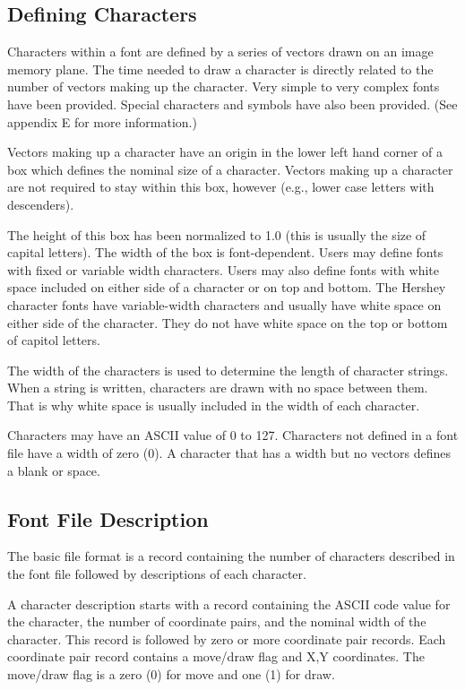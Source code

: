 \subsection{Defining Characters}
Characters within a font are defined by a series of vectors
drawn on an image memory plane.  The time needed to draw a character
is directly related to the number of vectors making up the character.
Very simple to very complex fonts have been provided.  Special
characters and symbols have also been provided.  (See appendix E for
more information.)

Vectors making up a character have an origin in the lower
left hand corner of a box which defines the nominal size of a
character.  Vectors making up a character are
not required to stay within this box, however (e.g., lower case
letters with descenders).

The height of this box has been normalized to 1.0 (this is
usually the size of capital letters).  The width of the box is
font-dependent.  Users may define fonts with fixed or variable width
characters.  Users may also define fonts with white space included on
either side of a character or on top and bottom.  The Hershey
character fonts have variable-width characters and usually have white
space on either side of the character.  They do not have
white space on the top or bottom of capitol letters.

The width of the characters is used to determine the length
of character strings.  When a string is written, characters are drawn
with no space between them.  That is why white space is usually
included in the width of each character.

Characters may have an ASCII value of 0 to 127.  Characters
not defined in a font file have a width of zero (0).  A character
that has a width but no vectors defines a blank or space.
\subsection{Font File Description}
The basic file format is a record containing the number of
characters described in the font file followed by descriptions of each
character.

A character description starts with a record containing the
ASCII code value for the character, the number of coordinate pairs,
and the nominal width of the character.  This record is
followed by zero or more coordinate pair records.  Each coordinate
pair record contains a move/draw flag and X,Y coordinates.  The
move/draw flag is a zero (0) for move and one (1) for draw.

